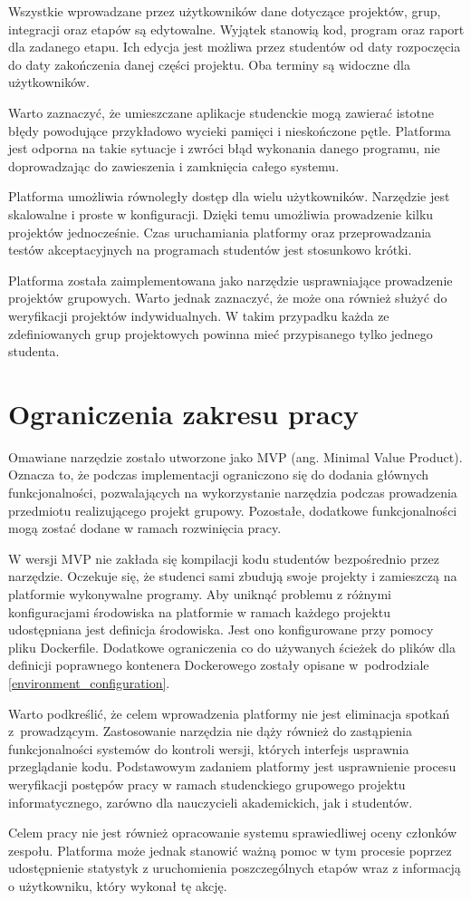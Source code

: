 Wszystkie wprowadzane przez użytkowników dane dotyczące projektów, grup, integracji oraz etapów są edytowalne.
Wyjątek stanowią kod, program oraz raport dla zadanego etapu.
Ich edycja jest możliwa przez studentów od daty rozpoczęcia do daty zakończenia danej części projektu.
Oba terminy są widoczne dla użytkowników.

Warto zaznaczyć, że umieszczane aplikacje studenckie mogą zawierać istotne błędy powodujące przykładowo wycieki pamięci i nieskończone pętle.
Platforma jest odporna na takie sytuacje i zwróci błąd wykonania danego programu, nie doprowadzając do zawieszenia i zamknięcia całego systemu.

Platforma umożliwia równoległy dostęp dla wielu użytkowników.
Narzędzie jest skalowalne i proste w konfiguracji.
Dzięki temu umożliwia prowadzenie kilku projektów jednocześnie.
Czas uruchamiania platformy oraz przeprowadzania testów akceptacyjnych na programach studentów jest stosunkowo krótki.

Platforma została zaimplementowana jako narzędzie usprawniające prowadzenie projektów grupowych.
Warto jednak zaznaczyć, że może ona również służyć do weryfikacji projektów indywidualnych.
W takim przypadku każda ze zdefiniowanych grup projektowych powinna mieć przypisanego tylko jednego studenta.


\section{Ograniczenia zakresu pracy}

Omawiane narzędzie zostało utworzone jako MVP (ang. Minimal Value Product).
Oznacza to, że podczas implementacji ograniczono się do dodania głównych funkcjonalności, pozwalających na wykorzystanie narzędzia podczas prowadzenia przedmiotu realizującego projekt grupowy.
Pozostałe, dodatkowe funkcjonalności mogą zostać dodane w ramach rozwinięcia pracy.

W wersji MVP nie zakłada się kompilacji kodu studentów bezpośrednio przez narzędzie.
Oczekuje się, że studenci sami zbudują swoje projekty i zamieszczą na platformie wykonywalne programy.
Aby uniknąć problemu z różnymi konfiguracjami środowiska na platformie w ramach każdego projektu udostępniana jest definicja środowiska.
Jest ono konfigurowane przy pomocy pliku Dockerfile.
Dodatkowe ograniczenia co do używanych ścieżek do plików dla definicji poprawnego kontenera Dockerowego zostały opisane w~podrodziale \ref{environment_configuration}.

Warto podkreślić, że celem wprowadzenia platformy nie jest eliminacja spotkań z~prowadzącym.
Zastosowanie narzędzia nie dąży również do zastąpienia funkcjonalności systemów do kontroli wersji, których interfejs usprawnia przeglądanie kodu.
Podstawowym zadaniem platformy jest usprawnienie procesu weryfikacji postępów pracy w ramach studenckiego grupowego projektu informatycznego, zarówno dla nauczycieli akademickich, jak i studentów.

Celem pracy nie jest również opracowanie systemu sprawiedliwej oceny członków zespołu.
Platforma może jednak stanowić ważną pomoc w tym procesie poprzez udostępnienie statystyk z uruchomienia poszczególnych etapów wraz z informacją o użytkowniku, który wykonał tę akcję.



